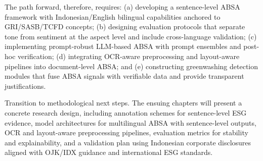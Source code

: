 The path forward, therefore, requires: (a) developing a sentence-level ABSA framework with Indonesian/English bilingual capabilities anchored to GRI/SASB/TCFD concepts; (b) designing evaluation protocols that separate tone from sentiment at the aspect level and include cross-language validation; (c) implementing prompt-robust LLM-based ABSA with prompt ensembles and post-hoc verification; (d) integrating OCR-aware preprocessing and layout-aware pipelines into document-level ABSA; and (e) constructing greenwashing detection modules that fuse ABSA signals with verifiable data and provide transparent justifications.

Transition to methodological next steps. The ensuing chapters will present a concrete research design, including annotation schemes for sentence-level ESG evidence, model architectures for multilingual ABSA with sentence-level outputs, OCR and layout-aware preprocessing pipelines, evaluation metrics for stability and explainability, and a validation plan using Indonesian corporate disclosures aligned with OJK/IDX guidance and international ESG standards.









